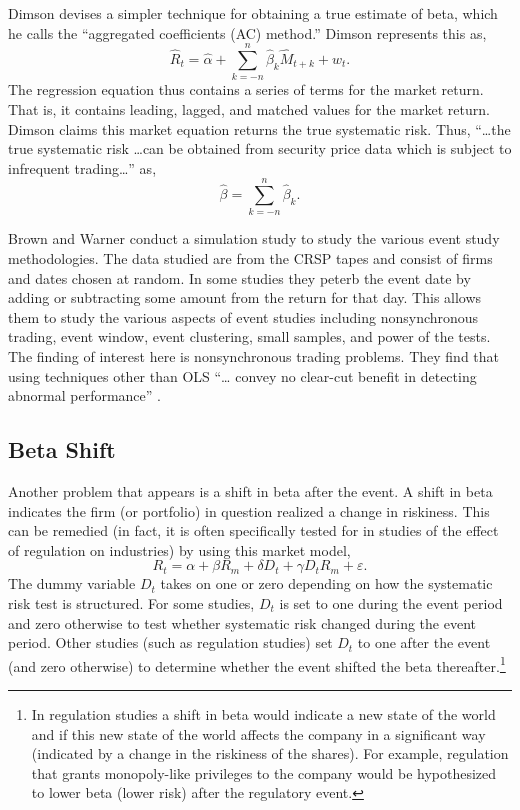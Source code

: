 Dimson \cite{dimson79} devises a simpler technique for obtaining a
true estimate of beta, which he calls the ``aggregated
coefficients (AC) method.''
Dimson represents this as,
\begin{equation}
\hat R_t=\hat \alpha+ \sum_{k=-n}^{n} \hat \beta_k \hat 
M_{t+k}+w_{t}.
\end{equation}
The regression equation thus contains a series of terms for
the market return.  That is, it contains leading, lagged,
and matched values for the market return.  Dimson claims
this market equation returns the true systematic risk.
Thus, ``\ldots the true systematic risk \ldots can be obtained
from security price data which is subject to infrequent
trading\ldots'' \cite[p. 204]{dimson79} as,
\begin{equation}
\hat \beta = \sum_{k=-n}^{n} \hat \beta_{k}.
\end{equation}

Brown and Warner \cite{brownwarner83} conduct a simulation
study to study the various event study methodologies.  The
data studied are from the 
CRSP tapes and consist of firms and dates
chosen at random.  In some studies they peterb the event
date by adding or subtracting some amount from the return
for that day.  This allows them to study the various aspects
of event studies including
nonsynchronous trading, event window, event
clustering, small samples, and power of the tests.  The
finding of interest here is nonsynchronous trading problems.
They find that using techniques other than OLS ``\ldots
convey no clear-cut benefit in detecting abnormal
performance'' \cite[p. 26]{brownwarner83}.

\subsection{Beta Shift}

Another problem that appears is a shift in beta after
the event.  A shift in beta indicates the firm (or
portfolio) in question realized a change in riskiness.  
This can be remedied (in fact, it is often
specifically tested for in studies of the effect of
regulation on industries) by using this market model,
\begin{equation}
R_{t}=\alpha+\beta R_{m} + \delta D_{t}  + \gamma D_{t} R_{m} +
\varepsilon.
\end{equation}
The dummy variable $D_{t}$ takes on one or zero depending on
how the systematic risk test is structured.  For some
studies, $D_{t}$ is set to one during the event period 
and zero otherwise to test whether systematic risk changed 
during the event
period.  Other studies (such as regulation studies) set
$D_{t}$ to one after the event (and zero otherwise) to
determine whether the event shifted the beta
thereafter.\footnote{In regulation studies a shift in beta
would indicate a new state of the world and if 
this new state of the world affects the company in a
significant way (indicated by a change in the riskiness of
the shares).  For example, regulation that grants monopoly-like
privileges to the company would be hypothesized to lower
beta (lower risk) after the regulatory event.}

